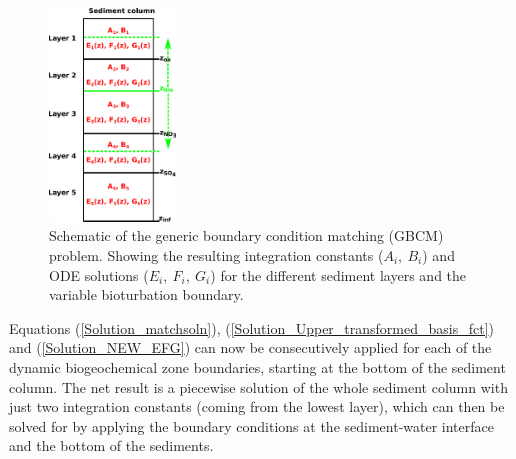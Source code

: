 \documentclass[gmd, manuscript]{copernicus}
\begin{document}
\begin{figure}[htbp]
\begin{center}
	\includegraphics[width=0.3\textwidth]{figures/Boundary_Matching_zbio.pdf}
	\caption{Schematic of the generic boundary condition matching (GBCM) problem. Showing the resulting integration constants ($A_i,\ B_i$) and ODE solutions ($E_i,\ F_i,\ G_i$) for the different sediment layers and the variable 
	bioturbation boundary.}
	\label{fig:Boundary_matching_algo}
	\end{center}
\end{figure}

Equations (\ref{Solution_matchsoln}), (\ref{Solution_Upper_transformed_basis_fct}) and (\ref{Solution_NEW_EFG}) can now be consecutively applied for each of the dynamic biogeochemical zone boundaries, starting at the bottom of the 
sediment column. The net result is a piecewise solution of the whole sediment column with just two integration constants (coming from the lowest layer), which can then be solved for by applying the boundary conditions at the 
sediment-water interface and the bottom of the sediments. 
\end{document}
